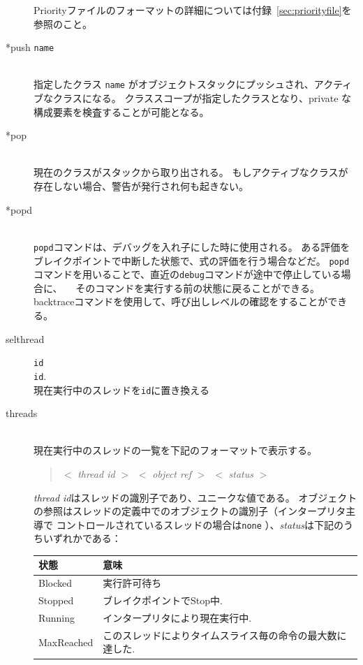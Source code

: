 \documentclass[\pformat,12pt]{jarticle}
\begin{document}
\begin{description}
  Priorityファイルのフォーマットの詳細については付録~\ref{sec:priorityfile}を参照のこと。

\item[*push {\tt name}] \mbox{}\\
  指定したクラス {\tt name} がオブジェクトスタックにプッシュされ、アクティブなクラスになる。 
  クラススコープが指定したクラスとなり、private な構成要素を検査することが可能となる。

\item[*pop] \mbox{}\\
  現在のクラスがスタックから取り出される。
  もしアクティブなクラスが存在しない場合、警告が発行され何も起きない。
  
\item[*popd] \mbox{}\\
  {\tt popd}コマンドは、デバッグを入れ子にした時に使用される。
  ある評価をブレイクポイントで中断した状態で、式の評価を行う場合などだ。
  {\tt popd}コマンドを用いることで、直近の{\tt debug}コマンドが途中で停止している場合に、
　そのコマンドを実行する前の状態に戻ることができる。
  backtraceコマンドを使用して、呼び出しレベルの確認をすることができる。

\item[selthread]\texttt{id}\mbox{}\\
  \texttt{id}. \\
  現在実行中のスレッドを\texttt{id}に置き換える


\item[threads]\mbox{}\\
現在実行中のスレッドの一覧を下記のフォーマットで表示する。
\begin{quote}
  $<$ \textit{thread id} $>$\ $<$ \textit{object ref} $>$\ $<$
\textit{status} $>$
\end{quote}
\textit{thread id}はスレッドの識別子であり、ユニークな値である。
オブジェクトの参照はスレッドの定義中でのオブジェクトの識別子（インタープリタ主導で
コントロールされているスレッドの場合は\texttt{none} ）、\textit{status}は下記のうちいずれかである：

\begin{tabular}{lp{10cm}}\hline
状態 & 意味 \\ \hline
Blocked    & 実行許可待ち \\ 
Stopped    & ブレイクポイントでStop中.\\
Running    & インタープリタにより現在実行中. \\
MaxReached & このスレッドによりタイムスライス毎の命令の最大数に達した. \\ \hline 
\end{tabular}



\end{description}
\end{document}
